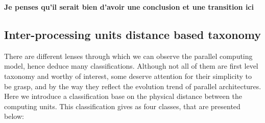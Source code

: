 \textbf{Je penses qu'il serait bien d'avoir une conclusion et une transition ici}



\subsection{Inter-processing units distance based taxonomy}
There are different lenses through which we can observe the parallel computing model, hence deduce many classifications. Although not all of them are first level taxonomy and worthy of interest, some deserve attention for their simplicity to be grasp, and by the way they reflect the evolution trend of parallel architectures. Here we introduce a classification base on the physical distance between the computing units. This classification gives as four classes, that are presented below:


